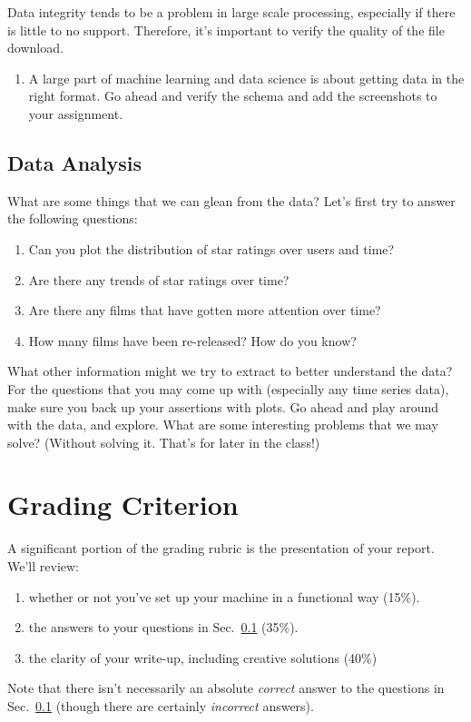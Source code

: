 \documentclass{cs6220-assignment}
\begin{document}
Data integrity tends to be a problem in large scale processing, especially if there is little to no support. Therefore, it's important to verify the quality of the file download. 

\noindent
\begin{enumerate}
\item A large part of machine learning and data science is about getting data in the right format. Go ahead and verify the schema and add the screenshots to your assignment.
\end{enumerate}


\subsection{Data Analysis}
\label{sec:data-analysis}

What are some things that we can glean from the data? Let's first try to answer the following questions: 

\begin{enumerate}
    \item Can you plot the distribution of star ratings over users and time?
    \item Are there any trends of star ratings over time?
    \item Are there any films that have gotten more attention over time?
    \item How many films have been re-released? How do you know?
\end{enumerate}

What other information might we try to extract to better understand the data? For the questions that you may come up with (especially any time series data), make sure you back up your assertions with plots. Go ahead and play around with the data, and explore. What are some interesting problems that we may solve? (Without solving it. That's for later in the class!)

\section{Grading Criterion}

A significant portion of the grading rubric is the presentation of your report. We'll review:

\begin{enumerate}
    \item whether or not you've set up your machine in a functional way (15\%).  
    \item the answers to your questions in Sec.~\ref{sec:data-analysis} (35\%).
    \item the clarity of your write-up, including creative solutions (40\%)
\end{enumerate}

Note that there isn't necessarily an absolute \emph{correct} answer to the questions in Sec.~\ref{sec:data-analysis} (though there are certainly \emph{incorrect} answers).
\end{document}
